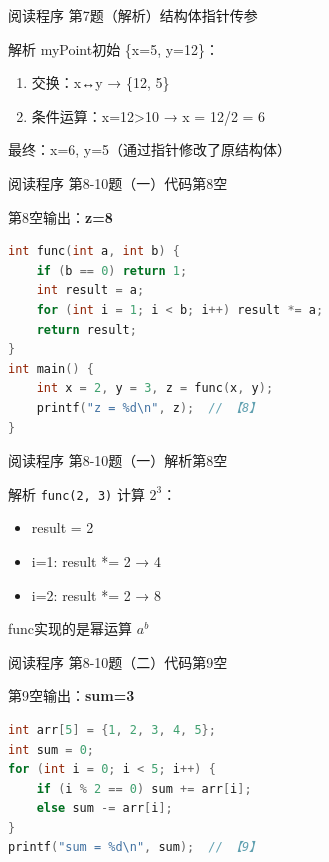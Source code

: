 \begin{frame}{阅读程序 第7题（解析）}{结构体指针传参}
    \begin{alertblock}{解析}
        \footnotesize myPoint初始 \{x=5, y=12\}：
        \begin{enumerate}
            \setlength{\itemsep}{0pt}
            \item 交换：x↔y → \{12, 5\}
            \item 条件运算：x=12>10 → x = 12/2 = 6
        \end{enumerate}
        最终：x=6, y=5（通过指针修改了原结构体）
    \end{alertblock}
\end{frame}

\begin{frame}[fragile]{阅读程序 第8-10题（一）代码}{第8空}
    \begin{exampleblock}{第8空输出：\textbf{z=8}}
    \end{exampleblock}
    \begin{lstlisting}[language=C]
int func(int a, int b) {
    if (b == 0) return 1;
    int result = a;
    for (int i = 1; i < b; i++) result *= a;
    return result;
}
int main() {
    int x = 2, y = 3, z = func(x, y);
    printf("z = %d\n", z);  // 【8】
}
\end{lstlisting}
\end{frame}

\begin{frame}{阅读程序 第8-10题（一）解析}{第8空}
    \begin{alertblock}{解析}
        \footnotesize \texttt{func(2, 3)} 计算 $2^3$：
        \begin{itemize}
            \setlength{\itemsep}{0pt}
            \item result = 2
            \item i=1: result *= 2 → 4
            \item i=2: result *= 2 → 8
        \end{itemize}
        func实现的是幂运算 $a^b$
    \end{alertblock}
\end{frame}

\begin{frame}[fragile]{阅读程序 第8-10题（二）代码}{第9空}
    \begin{exampleblock}{第9空输出：\textbf{sum=3}}
    \end{exampleblock}
    \begin{lstlisting}[language=C]
int arr[5] = {1, 2, 3, 4, 5};
int sum = 0;
for (int i = 0; i < 5; i++) {
    if (i % 2 == 0) sum += arr[i];
    else sum -= arr[i];
}
printf("sum = %d\n", sum);  // 【9】
\end{lstlisting}
\end{frame}

